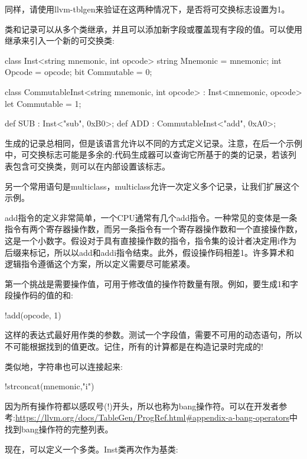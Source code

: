 同样，请使用llvm-tblgen来验证在这两种情况下，是否将可交换标志设置为1。

类和记录可以从多个类继承，并且可以添加新字段或覆盖现有字段的值。可以使用继承来引入一个新的可交换类:

\begin{shell}
class Inst<string mnemonic, int opcode> {
    string Mnemonic = mnemonic;
    int Opcode = opcode;
    bit Commutable = 0;
}

class CommutableInst<string mnemonic, int opcode>
    : Inst<mnemonic, opcode> {
    let Commutable = 1;
}

def SUB : Inst<"sub", 0xB0>;
def ADD : CommutableInst<"add", 0xA0>;
\end{shell}

生成的记录总相同，但是该语言允许以不同的方式定义记录。注意，在后一个示例中，可交换标志可能是多余的:代码生成器可以查询它所基于的类的记录，若该列表包含可交换类，则可以在内部设置该标志。


另一个常用语句是multiclass，multiclass允许一次定义多个记录，让我们扩展这个示例。

add指令的定义非常简单，一个CPU通常有几个add指令。一种常见的变体是一条指令有两个寄存器操作数，而另一条指令有一个寄存器操作数和一个直接操作数，这是一个小数字。假设对于具有直接操作数的指令，指令集的设计者决定用i作为后缀来标记，所以以add和addi指令结束。此外，假设操作码相差1。许多算术和逻辑指令遵循这个方案，所以定义需要尽可能紧凑。

第一个挑战是需要操作值，可用于修改值的操作符数量有限。例如，要生成1和字段操作码的值的和:

\begin{shell}
!add(opcode, 1)
\end{shell}

这样的表达式最好用作类的参数。测试一个字段值，需要不可用的动态语句，所以不可能根据找到的值更改。记住，所有的计算都是在构造记录时完成的!

类似地，字符串也可以连接起来:

\begin{shell}
!strconcat(mnemonic,"i")
\end{shell}

因为所有操作符都以感叹号(!)开头，所以也称为bang操作符。可以在开发者参考:\url{https://llvm.org/docs/TableGen/ProgRef.html#appendix-a-bang-operators}中找到bang操作符的完整列表。

现在，可以定义一个多类。Inst类再次作为基类:

